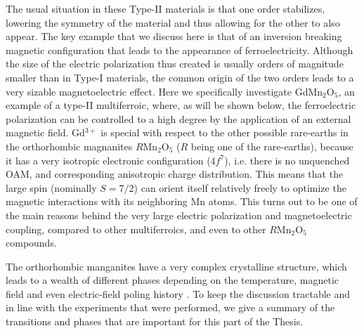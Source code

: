 The usual situation in these Type-II materials is that one order stabilizes, lowering the symmetry of the material and thus allowing for the other to also appear.
The key example that we discuss here is that of an inversion breaking magnetic configuration that leads to the appearance of ferroelectricity.
Although the size of the electric polarization thus created is usually orders of magnitude smaller than in Type-I materials, the common origin of the two orders leads to a very sizable magnetoelectric effect.
Here we specifically investigate GdMn$_2$O$_5$, an example of a type-II multiferroic\cite{Khomskii2009}, where, as will be shown below, the ferroelectric polarization can be controlled to a high degree by the application of an external magnetic field.
Gd$^{3+}$ is special with respect to the other possible rare-earths in the orthorhombic magnanites $R$Mn$_2$O$_5$ ($R$ being one of the rare-earths), because it has a very isotropic electronic configuration (4$f^7$), i.e. there is no unquenched OAM, and corresponding anisotropic charge distribution. This means that the large spin (nominally $S=7/2$) can orient itself relatively freely to optimize the magnetic interactions with its neighboring Mn atoms.
This turns out to be one of the main reasons behind the very large electric polarization and magnetoelectric coupling, compared to other multiferroics, and even to other $R$Mn$_2$O$_5$ compounds.

The orthorhombic manganites have a very complex crystalline structure, which leads to a wealth of different phases depending on the temperature, magnetic field and even electric-field poling history \cite{Zheng2019}.
To keep the discussion tractable and in line with the experiments that were performed, we give a summary of the transitions and phases that are important for this part of the Thesis.

